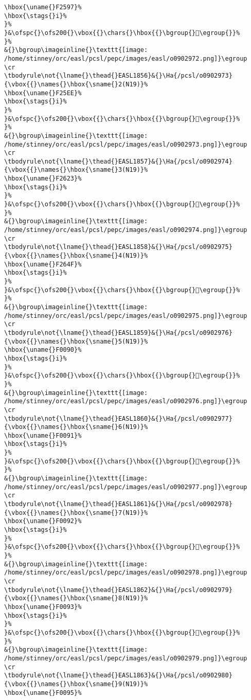 \begin{verbatim}
\hbox{\uname{}F2597}%
\hbox{\stags{}i}%
}%
}&\ofspc{}\ofs200{}\vbox{{}\chars{}\hbox{{}\bgroup{}󲖗\egroup{}}%
}%
&{}\bgroup\imageinline{}\texttt{[image: /home/stinney/orc/easl/pcsl/pepc/images/easl/o0902972.png]}\egroup
\cr
\tbodyrule\not{\lname{}\thead{}EASL1856}&{}\Ha{/pcsl/o0902973}{\vbox{{}\names{}\hbox{\sname{}2(N19)}%
\hbox{\uname{}F25EE}%
\hbox{\stags{}i}%
}%
}&\ofspc{}\ofs200{}\vbox{{}\chars{}\hbox{{}\bgroup{}󲗮\egroup{}}%
}%
&{}\bgroup\imageinline{}\texttt{[image: /home/stinney/orc/easl/pcsl/pepc/images/easl/o0902973.png]}\egroup
\cr
\tbodyrule\not{\lname{}\thead{}EASL1857}&{}\Ha{/pcsl/o0902974}{\vbox{{}\names{}\hbox{\sname{}3(N19)}%
\hbox{\uname{}F2623}%
\hbox{\stags{}i}%
}%
}&\ofspc{}\ofs200{}\vbox{{}\chars{}\hbox{{}\bgroup{}󲘣\egroup{}}%
}%
&{}\bgroup\imageinline{}\texttt{[image: /home/stinney/orc/easl/pcsl/pepc/images/easl/o0902974.png]}\egroup
\cr
\tbodyrule\not{\lname{}\thead{}EASL1858}&{}\Ha{/pcsl/o0902975}{\vbox{{}\names{}\hbox{\sname{}4(N19)}%
\hbox{\uname{}F264F}%
\hbox{\stags{}i}%
}%
}&\ofspc{}\ofs200{}\vbox{{}\chars{}\hbox{{}\bgroup{}󲙏\egroup{}}%
}%
&{}\bgroup\imageinline{}\texttt{[image: /home/stinney/orc/easl/pcsl/pepc/images/easl/o0902975.png]}\egroup
\cr
\tbodyrule\not{\lname{}\thead{}EASL1859}&{}\Ha{/pcsl/o0902976}{\vbox{{}\names{}\hbox{\sname{}5(N19)}%
\hbox{\uname{}F0090}%
\hbox{\stags{}i}%
}%
}&\ofspc{}\ofs200{}\vbox{{}\chars{}\hbox{{}\bgroup{}󰂐\egroup{}}%
}%
&{}\bgroup\imageinline{}\texttt{[image: /home/stinney/orc/easl/pcsl/pepc/images/easl/o0902976.png]}\egroup
\cr
\tbodyrule\not{\lname{}\thead{}EASL1860}&{}\Ha{/pcsl/o0902977}{\vbox{{}\names{}\hbox{\sname{}6(N19)}%
\hbox{\uname{}F0091}%
\hbox{\stags{}i}%
}%
}&\ofspc{}\ofs200{}\vbox{{}\chars{}\hbox{{}\bgroup{}󰂑\egroup{}}%
}%
&{}\bgroup\imageinline{}\texttt{[image: /home/stinney/orc/easl/pcsl/pepc/images/easl/o0902977.png]}\egroup
\cr
\tbodyrule\not{\lname{}\thead{}EASL1861}&{}\Ha{/pcsl/o0902978}{\vbox{{}\names{}\hbox{\sname{}7(N19)}%
\hbox{\uname{}F0092}%
\hbox{\stags{}i}%
}%
}&\ofspc{}\ofs200{}\vbox{{}\chars{}\hbox{{}\bgroup{}󰂒\egroup{}}%
}%
&{}\bgroup\imageinline{}\texttt{[image: /home/stinney/orc/easl/pcsl/pepc/images/easl/o0902978.png]}\egroup
\cr
\tbodyrule\not{\lname{}\thead{}EASL1862}&{}\Ha{/pcsl/o0902979}{\vbox{{}\names{}\hbox{\sname{}8(N19)}%
\hbox{\uname{}F0093}%
\hbox{\stags{}i}%
}%
}&\ofspc{}\ofs200{}\vbox{{}\chars{}\hbox{{}\bgroup{}󰂓\egroup{}}%
}%
&{}\bgroup\imageinline{}\texttt{[image: /home/stinney/orc/easl/pcsl/pepc/images/easl/o0902979.png]}\egroup
\cr
\tbodyrule\not{\lname{}\thead{}EASL1863}&{}\Ha{/pcsl/o0902980}{\vbox{{}\names{}\hbox{\sname{}9(N19)}%
\hbox{\uname{}F0095}%

\end{verbatim}
